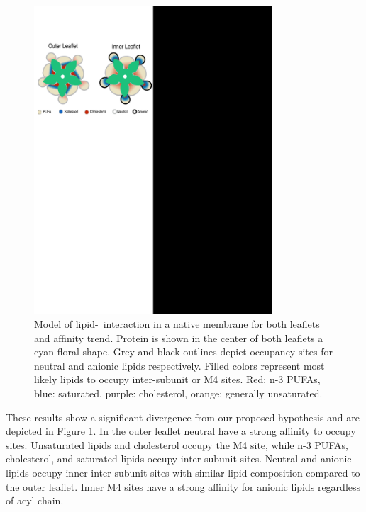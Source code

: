 \begin{figure}
	\center
	\includegraphics[width=3.5in]{Figures/Summary.pdf}
	\caption[Model of lipid-\nachr~interaction in a native membrane for both leaflets and affinity trend.] {Model of lipid-\nachr~interaction in a native membrane for both leaflets and affinity trend. Protein is shown in the center of both leaflets a cyan floral shape. Grey and black outlines depict occupancy sites for neutral and anionic lipids respectively. Filled colors represent most likely lipids to occupy inter-subunit or M4 sites. Red: n-3 PUFAs, blue: saturated, purple: cholesterol, orange: generally unsaturated. }
	\label{fig:sum}
\end{figure}

These results show a significant divergence from our proposed hypothesis and are depicted in Figure \ref{fig:sum}. In the outer leaflet neutral have a strong affinity to occupy sites. Unsaturated lipids and cholesterol occupy the M4 site, while n-3 PUFAs, cholesterol, and saturated lipids occupy inter-subunit sites. Neutral and anionic lipids occupy inner inter-subunit sites with similar lipid composition compared to the outer leaflet. Inner M4 sites have a strong affinity for anionic lipids regardless of acyl chain.

